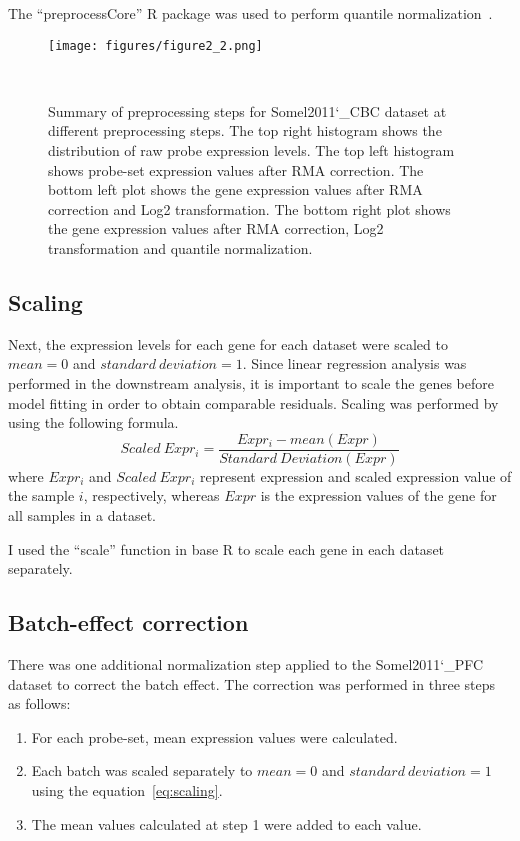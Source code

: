The ``preprocessCore'' R package was used to perform quantile normalization~\cite{Bolstad2021}.

\begin{figure}[h]
\centering
\texttt{[image: figures/figure2\_2.png]}
\caption{Summary of preprocessing steps for Somel2011\char`_CBC dataset at different preprocessing steps. 
The top right histogram shows the distribution of raw probe expression levels. 
The top left histogram shows probe-set expression values after RMA correction. 
The bottom left plot shows the gene expression values after RMA correction and Log2 transformation.
The bottom right plot shows the gene expression values after RMA correction, Log2 transformation and quantile normalization.}~\label{fig:fig2.2}
\end{figure}

\subsection{Scaling}
Next, the expression levels for each gene for each dataset were scaled to $mean=0$ and $standard\ deviation=1$. 
Since linear regression analysis was performed in the downstream analysis, 
it is important to scale the genes before model fitting in order to obtain comparable residuals.
Scaling was performed by using the following formula.
\begin{equation}
    Scaled\ Expr_i = \frac{Expr_i - mean(Expr)}{Standard\ Deviation(Expr)}
    \label{eq:scaling}
\end{equation}
where $Expr_i$ and $Scaled\ Expr_i$ represent expression and scaled expression value of the sample $i$, respectively, 
whereas $Expr$ is the expression values of the gene for all samples in a dataset.

I used the ``scale'' function in base R to scale each gene in each dataset separately.

\subsection{Batch-effect correction}
There was one additional normalization step applied to the Somel2011\char`_PFC dataset to correct the batch effect.
The correction was performed in three steps as follows:

\begin{enumerate}
    \item For each probe-set, mean expression values were calculated.
    \item Each batch was scaled separately to $mean=0$ and $standard\ deviation=1$ using the equation~\ref{eq:scaling}.
    \item The mean values calculated at step 1 were added to each value.
\end{enumerate}

